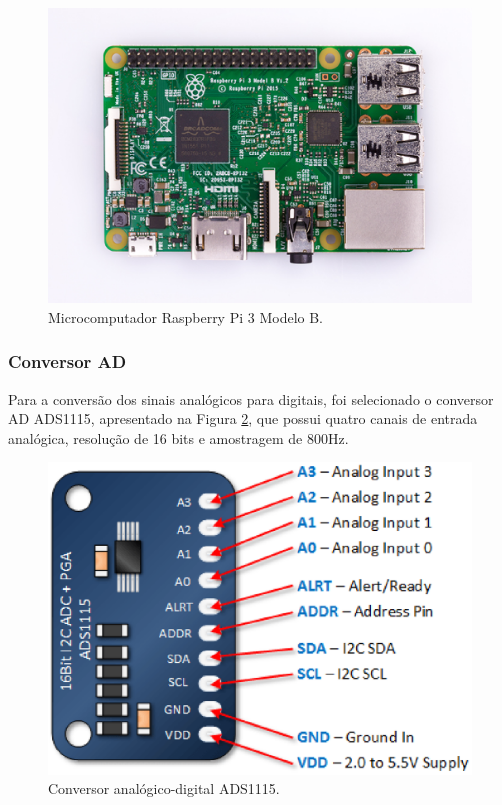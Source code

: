 \begin{figure}[H]
  \centering
    \includegraphics[keepaspectratio=true,scale=0.6]{figuras/rasp.eps}
  \caption{Microcomputador Raspberry Pi 3 Modelo B.}
  \label{fig:rasp}
\end{figure}

\subsubsection{Conversor AD}
Para a conversão dos sinais analógicos para digitais, foi selecionado o conversor 
AD ADS1115, apresentado na Figura \ref{fig:ads}, que possui quatro canais de entrada analógica, resolução de 16 bits 
e amostragem de 800Hz. 

\begin{figure}[H]
  \centering
    \includegraphics[keepaspectratio=true,scale=0.7]{figuras/ads.eps}
  \caption{Conversor analógico-digital ADS1115.}
  \label{fig:ads}
\end{figure}

